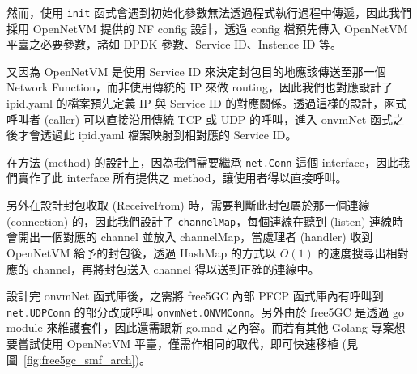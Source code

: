 然而，使用 \lstinline[language=Go]{init} 函式會遇到初始化參數無法透過程式執行過程中傳遞，因此我們採用 OpenNetVM 提供的 NF config 設計，透過 config 檔預先傳入 OpenNetVM 平臺之必要參數，諸如 DPDK 參數、Service ID、Instence ID 等。

又因為 OpenNetVM 是使用 Service ID 來決定封包目的地應該傳送至那一個 Network Function，而非使用傳統的 IP 來做 routing，因此我們也對應設計了 ipid.yaml 的檔案預先定義 IP 與 Service ID 的對應關係。透過這樣的設計，函式呼叫者 (caller) 可以直接沿用傳統 TCP 或 UDP 的呼叫，進入 onvmNet 函式之後才會透過此 ipid.yaml 檔案映射到相對應的 Service ID。

在方法 (method) 的設計上，因為我們需要繼承 \lstinline[language=Go]{net.Conn} 這個 interface，因此我們實作了此 interface 所有提供之 method，讓使用者得以直接呼叫。

另外在設計封包收取 (ReceiveFrom) 時，需要判斷此封包屬於那一個連線 (connection) 的，因此我們設計了 \lstinline{channelMap}，每個連線在聽到 (listen) 連線時會開出一個對應的 channel 並放入 channelMap，當處理者 (handler) 收到 OpenNetVM 給予的封包後，透過 HashMap 的方式以 $O(1)$ 的速度搜尋出相對應的 channel，再將封包送入 channel 得以送到正確的連線中。


設計完 onvmNet 函式庫後，之需將 free5GC 內部 PFCP 函式庫內有呼叫到 \lstinline[language=Go]{net.UDPConn} 的部分改成呼叫 \lstinline[language=Go]{onvmNet.ONVMConn}。另外由於 free5GC 是透過 go module 來維護套件，因此還需跟新 go.mod 之內容。而若有其他 Golang 專案想要嘗試使用 OpenNetVM 平臺，僅需作相同的取代，即可快速移植 (見圖~\ref{fig:free5gc_smf_arch})。

